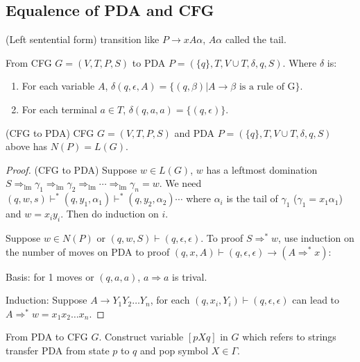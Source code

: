 
\usepackage{../../lectures_preamble}


    \subsection{Equalence of PDA and CFG}
        \begin{definition}
            (Left sentential form) transition like $P\rightarrow xA\alpha$, $A\alpha$ called the tail.
        \end{definition}
        From CFG $G=(V,T,P,S)$ to PDA $P=(\{q\},T,V\cup T,\delta,q,S)$. Where $\delta$ is:
        \begin{enumerate}
            \item For each variable $A$, $\delta(q,\epsilon,A)=\{(q,\beta)|A\rightarrow \beta \text{ is a rule of } $G$\}$.
            \item For each terminal $a \in T$, $\delta(q,a,a)=\{(q,\epsilon)\}$.
        \end{enumerate}
        \begin{theorem}
            (CFG to PDA) CFG $G=(V,T,P,S)$ and PDA $P=(\{q\},T,V\cup T,\delta,q,S)$ above has $N(P)=L(G)$.
        \end{theorem}
        \begin{proof}
            (CFG to PDA) Suppose $w\in L(G)$, $w$ has a leftmost domination $S\Rightarrow_{\mathrm{lm}} \gamma_1\Rightarrow_{\mathrm{lm}} \gamma_2\Rightarrow _{\mathrm{lm}}\cdots\Rightarrow _{\mathrm{lm}}\gamma_{n}=w$. We need $(q,w,s)\vdash ^{*}(q,y_1,\alpha_1)\vdash ^{*}(q,y_2,\alpha_2)\cdots$ where $\alpha_i$ is the tail of $\gamma_1$ ($\gamma_1=x_1\alpha_1$) and $w=x_{i}y_{i}$. Then do induction on $i$.

            Suppose $w\in N(P)$ or $(q,w,S)\vdash (q,\epsilon,\epsilon)$. To proof $S\Rightarrow ^{*}w$, use induction on the number of moves on PDA to proof $(q,x,A)\vdash(q,\epsilon,\epsilon)\rightarrow (A\Rightarrow ^{*}x)$:
            
            Basis: for 1 moves or $(q,a,a)$, $a\Rightarrow a$ is trival.

            Induction: Suppose $A\rightarrow Y_1Y_2\ldots Y_{n}$, for each $(q,x_{i},Y_{i})\vdash(q,\epsilon,\epsilon)$ can lead to $A\Rightarrow ^{*}w=x_1x_2\ldots x_{n}$.
        \end{proof}
        From PDA to CFG $G$. Construct variable $[pXq]$ in $G$ which refers to strings transfer PDA from state $p$ to $q$ and pop symbol $X\in \Gamma$.
